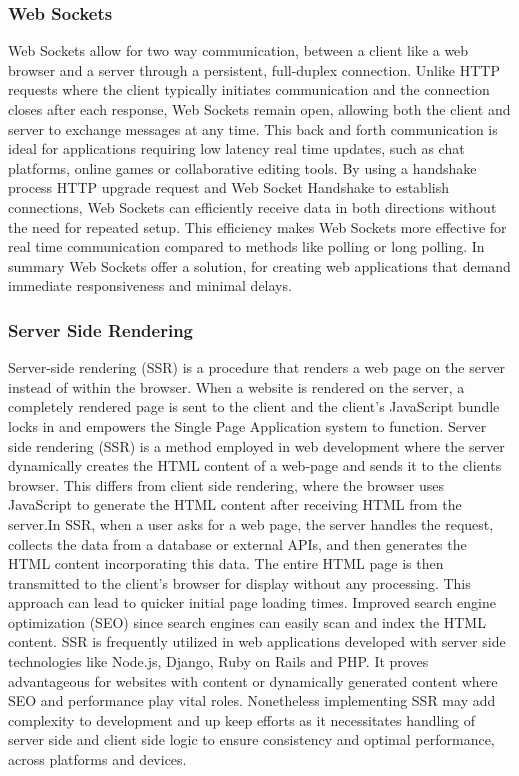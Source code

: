 \documentclass[a4paper,12pt]{article}  %
\begin{document}
\subsubsection{Web Sockets}
Web Sockets allow for two way communication, between a client like a web
browser and a server through a persistent, full-duplex connection. Unlike HTTP
requests where the client typically initiates communication and the connection
closes after each response, Web Sockets remain open, allowing both the client
and server to exchange messages at any time. This back and forth communication
is ideal for applications requiring low latency real time updates, such as chat
platforms, online games or collaborative editing tools. By using a handshake
process HTTP upgrade request and Web Socket Handshake to establish connections,
Web Sockets can efficiently receive data in both directions without the need
for repeated setup. This efficiency makes Web Sockets more effective for real
time communication compared to methods like polling or long polling. In summary
Web Sockets offer a solution, for creating web applications that demand
immediate responsiveness and minimal delays.\\

\subsubsection{Server Side Rendering}
Server-side rendering (SSR) is a procedure that renders a web page on the
server instead of within the browser. When a website is rendered on the server,
a completely rendered page is sent to the client and the client's JavaScript
bundle locks in and empowers the Single Page Application system to function.
Server side rendering (SSR) is a method employed in web development where the
server dynamically creates the HTML content of a web-page and sends it to the
clients browser. This differs from client side rendering, where the browser
uses JavaScript to generate the HTML content after receiving HTML from the
server.In SSR, when a user asks for a web page, the server handles the request,
collects the data from a database or external APIs, and then generates the HTML
content incorporating this data. The entire HTML page is then transmitted to
the client's browser for display without any processing. This approach can lead
to quicker initial page loading times. Improved search engine optimization
(SEO) since search engines can easily scan and index the HTML content. SSR is
frequently utilized in web applications developed with server side technologies
like Node.js, Django, Ruby on Rails and PHP. It proves advantageous for
websites with content or dynamically generated content where SEO and
performance play vital roles. Nonetheless implementing SSR may add complexity
to development and up keep efforts as it necessitates handling of server side
and client side logic to ensure consistency and optimal performance, across
platforms and devices.\\
\end{document}
